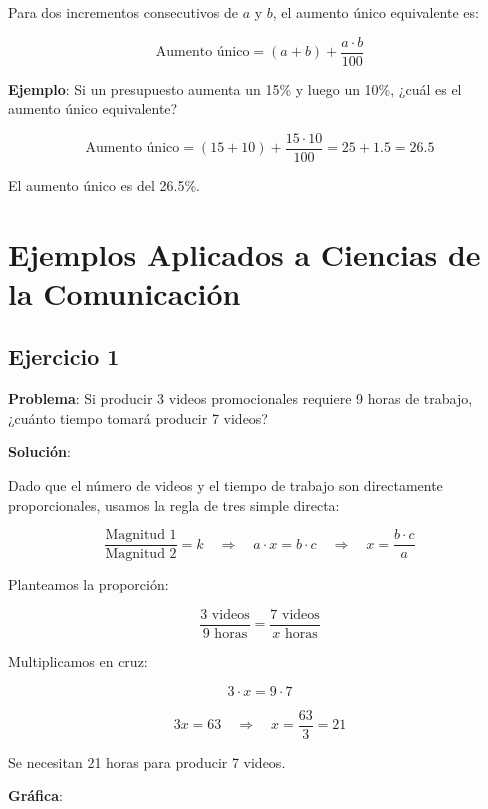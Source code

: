 \documentclass[
  stu,
  floatsintext,
  longtable,
  a4paper,
  nolmodern,
  notxfonts,
  notimes,
  colorlinks=true,linkcolor=blue,citecolor=blue,urlcolor=blue]{apa7}
\begin{document}
Para dos incrementos consecutivos de \(a%
\) y \(b%
\), el aumento único equivalente es:

\[
\text{Aumento único} = (a + b) + \frac{a \cdot b}{100}
\]

\textbf{Ejemplo}: Si un presupuesto aumenta un 15\% y luego un 10\%,
¿cuál es el aumento único equivalente?

\[
\text{Aumento único} = (15 + 10) + \frac{15 \cdot 10}{100} = 25 + 1.5 = 26.5
\]

El aumento único es del 26.5\%.

\section{Ejemplos Aplicados a Ciencias de la
Comunicación}\label{ejemplos-aplicados-a-ciencias-de-la-comunicaciuxf3n}

\subsection{Ejercicio 1}\label{ejercicio-1}

\textbf{Problema}: Si producir 3 videos promocionales requiere 9 horas
de trabajo, ¿cuánto tiempo tomará producir 7 videos?

\textbf{Solución}:

Dado que el número de videos y el tiempo de trabajo son directamente
proporcionales, usamos la regla de tres simple directa:

\[
\frac{\text{Magnitud 1}}{\text{Magnitud 2}} = k \quad \Rightarrow \quad a \cdot x = b \cdot c \quad \Rightarrow \quad x = \frac{b \cdot c}{a}
\]

Planteamos la proporción:

\[
\frac{3 \text{ videos}}{9 \text{ horas}} = \frac{7 \text{ videos}}{x \text{ horas}}
\]

Multiplicamos en cruz:

\[
3 \cdot x = 9 \cdot 7
\]

\[
3x = 63 \quad \Rightarrow \quad x = \frac{63}{3} = 21
\]

Se necesitan 21 horas para producir 7 videos.

\textbf{Gráfica}:
\end{document}
